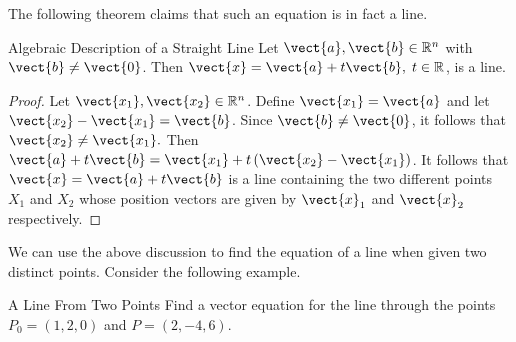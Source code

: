 The following theorem claims that such an equation is in fact a line. 

\begin{proposition}{Algebraic Description of a Straight Line}\label{prop:algebraicstraightline}
Let $\vect{a},\vect{b}\in \mathbb{R}^{n}$ with $\vect{b}\neq \vect{0}$. 
Then $\vect{x}=\vect{a}+t\vect{b},\; t\in \mathbb{R}$, is a
line.
\end{proposition}

\begin{proof}
Let $\vect{x_{1}}, \vect{x_{2}} \in \mathbb{R}^n$. 
Define $\vect{x_{1}}=\vect{a}$ and let $\vect{x_{2}}-\vect{x_{1}}=\vect{b}$.
Since $\vect{b} \neq \vect{0}$, it follows that $\vect{x_{2}}\neq \vect{x_{1}}.$ Then
$\vect{a}+t\vect{b}=\vect{x_{1}} + t\left( \vect{x_{2}}-\vect{x_{1}}\right) $. It follows that  
$\vect{x}=\vect{a}+t\vect{b}$ is a line containing the two different points 
$X_1$ and $X_2$ whose position vectors are given by $\vect{x}_1$ and $\vect{x}_2$ respectively. 
\end{proof}

We can use the above discussion to find the equation of a line when given two distinct points.
Consider the following example. 

\begin{example}{A Line From Two Points}\label{exa:linefromtwopoints}
Find a vector equation for the line through the points $P_0 = \left(
1,2,0\right) $ and $P = \left( 2,-4,6\right).$
\end{example}

